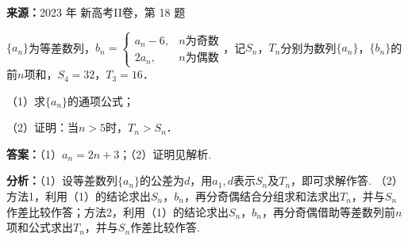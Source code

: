 \begin{question}[points=10]
\textbf{来源：}2023 年 新高考II卷，第 18 题\par
$\{a_{n}\}$为等差数列，$b_{n}=\begin{cases}a_{n}-6, & n\text{为奇数}\\ 2a_{n}, & n\text{为偶数}\end{cases}$，记$S_{n}$，$T_{n}$分别为数列$\{a_{n}\}$，$\{b_{n}\}$的前$n$项和，$S_{4}=32$，$T_{3}=16$．

（1）求$\{a_{n}\}$的通项公式；

（2）证明：当$n>5$时，$T_{n}>S_{n}$．
\begin{solution}
\textbf{答案：}（1）$a_{n}=2n+3$；（2）证明见解析.

\textbf{分析：}（1）设等差数列$\{a_{n}\}$的公差为$d$，用$a_{1},d$表示$S_{n}$及$T_{n}$，即可求解作答.
（2）方法1，利用（1）的结论求出$S_{n}$，$b_{n}$，再分奇偶结合分组求和法求出$T_{n}$，并与$S_{n}$作差比较作答；方法2，利用（1）的结论求出$S_{n}$，$b_{n}$，再分奇偶借助等差数列前$n$项和公式求出$T_{n}$，并与$S_{n}$作差比较作答.


\end{solution}
\end{question}
